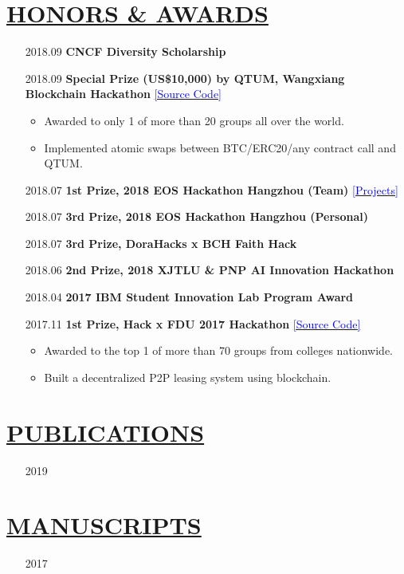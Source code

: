 \documentclass[11pt]{article}
\begin{document}
\section*{\centering\underline{HONORS \& AWARDS}}
\begin{itemize}[noitemsep, nolistsep]
    \item[2018.09]\textbf{CNCF Diversity Scholarship}
    \item[2018.09]\textbf{Special Prize (US\$10,000) by QTUM, Wangxiang Blockchain Hackathon} \href{https://github.com/PRIEWIENV/QtumSwap}{\textcolor{blue}{[Source Code]}}
        \begin{itemize}[noitemsep, nolistsep]
            \small
            \item Awarded to only 1 of more than 20 groups all over the world. 
            \item Implemented atomic swaps between BTC/ERC20/any contract call and QTUM.
        \end{itemize} 
    \item[2018.07]\textbf{1st Prize, 2018 EOS Hackathon Hangzhou (Team)} \href{https://github.com/Acappella-dream}{\textcolor{blue}{[Projects]}}
    \item[2018.07]\textbf{3rd Prize, 2018 EOS Hackathon Hangzhou (Personal)}
    \item[2018.07]\textbf{3rd Prize, DoraHacks x BCH Faith Hack}
    \item[2018.06]\textbf{2nd Prize, 2018 XJTLU \& PNP AI Innovation Hackathon}
    \item[2018.04]\textbf{2017 IBM Student Innovation Lab Program Award}
    \item[2017.11]\textbf{1st Prize, Hack x FDU 2017 Hackathon} \href{https://github.com/dexhunter/hackxfdu-DSharing}{\textcolor{blue}{[Source Code]}}
        \begin{itemize}[noitemsep, nolistsep]
            \small
            \item Awarded to the top 1 of more than 70 groups from colleges nationwide.
            \item Built a decentralized P2P leasing system using blockchain. 
        \end{itemize} 
\end{itemize}




\section*{\centering\underline{PUBLICATIONS}}
\begin{itemize}
    \item[2019] 
\end{itemize}
\section*{\centering\underline{MANUSCRIPTS}}
\begin{itemize}
    \item[2017] 
\end{itemize}
\end{document}
